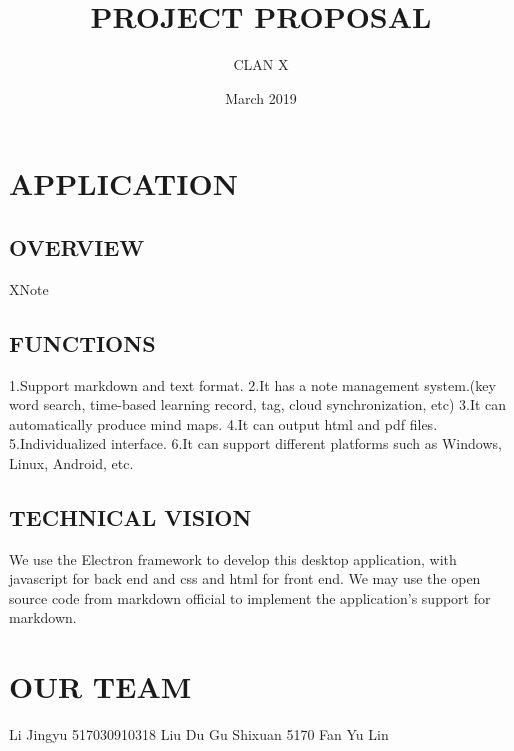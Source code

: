 \documentclass{article}
\title{PROJECT PROPOSAL}
\author{CLAN X}
\date{March 2019}
\begin{document}
\maketitle
\tableofcontents
\newpage
\section{APPLICATION}
\subsection{OVERVIEW}
XNote
\subsection{FUNCTIONS}
1.Support markdown and text format.
\newline
2.It has a note management system.(key word search, time-based learning record, tag, cloud synchronization, etc)
\newline
3.It can automatically produce mind maps.
\newline
4.It can output html and pdf files.
\newline
5.Individualized interface.
\newline
6.It can support different platforms such as Windows, Linux, Android, etc.
\subsection{TECHNICAL VISION}
We use the Electron framework to develop this desktop application, with javascript for back end and css and html for front end. We may use the open source code from markdown official to implement the application's support for markdown.

\section{OUR TEAM}
Li Jingyu 517030910318 
\newline
Liu Du
\newline
Gu Shixuan 5170
\newline
Fan Yu
\newline
Lin
\newline
\end{document}
